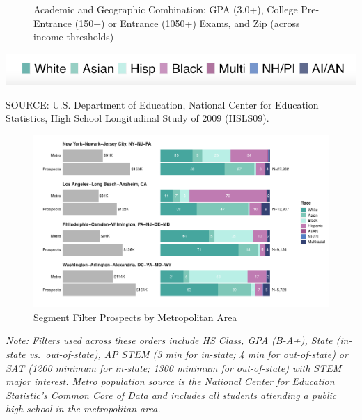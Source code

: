 \documentclass[
  12pt,
]{article}
\begin{document}
\begin{landscape}
\begin{figure}
{}

\caption{Academic and Geographic Combination: GPA (3.0+), College Pre-Entrance (150+) or Entrance (1050+) Exams, and Zip (across income thresholds)}\label{fig:gpa-sat-psat-zip}
\end{figure}


\begin{center}\includegraphics[width=0.32\linewidth]{./../../outputs/figures/legend_horizontal} \end{center}

\begingroup
\fontsize{8}{8}\selectfont
SOURCE: U.S. Department of Education, National Center for Education Statistics, High School Longitudinal Study of 2009 (HSLS09).
\endgroup

\end{landscape}

\restoregeometry

\clearpage

\begin{figure}
\centering
\includegraphics{eepa_student_list_manuscript_c_a_files/figure-latex/uiuc-deep-dive-1.pdf}
\caption{\label{fig:uiuc-deep-dive}Segment Filter Prospects by Metropolitan Area}
\end{figure}

\begingroup
\fontsize{10}{10}\selectfont

\emph{Note: Filters used across these orders include HS Class, GPA (B-A+), State (in-state vs.~out-of-state), AP STEM (3 min for in-state; 4 min for out-of-state) or SAT (1200 minimum for in-state; 1300 minimum for out-of-state) with STEM major interest. Metro population source is the National Center for Education Statistic's Common Core of Data and includes all students attending a public high school in the metropolitan area. }
\endgroup
\end{document}

